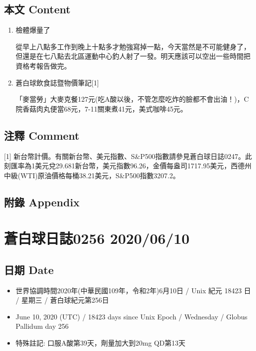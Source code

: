 \documentclass[
]{article}
\providecommand{\tightlist}{%
  \setlength{\itemsep}{0pt}\setlength{\parskip}{0pt}}
\begin{document}
\hypertarget{ux672cux6587-content-8}{%
\subsection{本文 Content}\label{ux672cux6587-content-8}}

\begin{enumerate}
\def\labelenumi{\arabic{enumi}.}
\item
  檢體爆量了

  從早上八點多工作到晚上十點多才勉強寫掉一點，今天當然是不可能健身了，但還是在七八點去北區運動中心釣人射了一發。明天應該可以空出一些時間把資格考報告做完。
\item
  蒼白球飲食誌暨物價筆記{[}1{]}

  「麥當勞」大麥克餐127元(吃A酸以後，不管怎麼吃炸的臉都不會出油！)，C院香菇肉丸便當68元，7-11關東煮41元，美式咖啡45元。
\end{enumerate}

\hypertarget{ux6ce8ux91cb-comment-8}{%
\subsection{注釋 Comment}\label{ux6ce8ux91cb-comment-8}}

{[}1{]}
新台幣計價。有關新台幣、美元指數、S\&P500指數請參見蒼白球日誌0247。此刻匯率為1美元兌29.681新台幣，美元指數96.26，金價每盎司1717.95美元，西德州中級(WTI)原油價格每桶38.21美元，S\&P500指數3207.2。

\hypertarget{ux9644ux9304-appendix-8}{%
\subsection{附錄 Appendix}\label{ux9644ux9304-appendix-8}}

\hypertarget{ux84bcux767dux7403ux65e5ux8a8c0256-20200610}{%
\section{蒼白球日誌0256
2020/06/10}\label{ux84bcux767dux7403ux65e5ux8a8c0256-20200610}}

\hypertarget{ux65e5ux671f-date-9}{%
\subsection{日期 Date}\label{ux65e5ux671f-date-9}}

\begin{itemize}
\tightlist
\item
  世界協調時間2020年(中華民國109年，令和2年)6月10日 / Unix 紀元 18423 日
  / 星期三 / 蒼白球紀元第256日
\item
  June 10, 2020 (UTC) / 18423 days since Unix Epoch / Wednesday / Globus
  Pallidum day 256
\item
  特殊註記: 口服A酸第39天，劑量加大到20mg QD第13天
\end{itemize}
\end{document}
